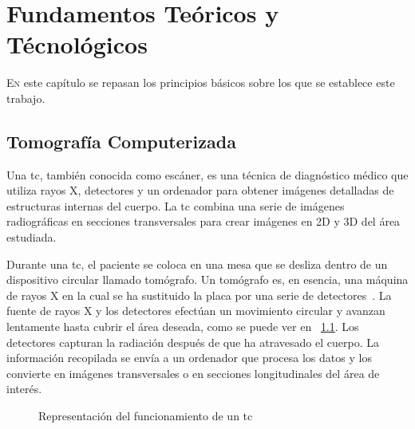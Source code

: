 \chapter{Fundamentos Teóricos y Técnológicos}
\label{chap:ft}
\lettrine{E}{n} este capítulo se repasan los principios básicos sobre los que se establece este trabajo.
\section{Tomografía Computerizada}

Una \acrfull{tc}, también conocida como escáner, es una técnica de
diagnóstico médico que utiliza rayos X, detectores y un ordenador para
obtener imágenes detalladas de estructuras internas del cuerpo. La
\acrshort{tc} combina una serie de imágenes radiográficas en secciones
transversales para crear imágenes en 2D y 3D del área estudiada.

Durante una \acrshort{tc}, el paciente se coloca en una mesa que se
desliza dentro de un dispositivo circular llamado tomógrafo. Un
tomógrafo es, en esencia, una máquina de rayos X en la cual se ha
sustituido la placa por una serie de
detectores~\cite{muniz2006introduccion}. La fuente de rayos X y los
detectores efectúan un movimiento circular y avanzan lentamente hasta
cubrir el área deseada, como se puede ver en
\figurename~\ref{fig:tac}. Los detectores capturan la radiación
después de que ha atravesado el cuerpo. La información recopilada se
envía a un ordenador que procesa los datos y los convierte en imágenes
transversales o en secciones longitudinales del área de interés.

\begin{figure}%
    \centering
    \qquad
    \caption{Representación del funcionamiento de un \acrshort{tc}}%
    \label{fig:tac}%
\end{figure}

